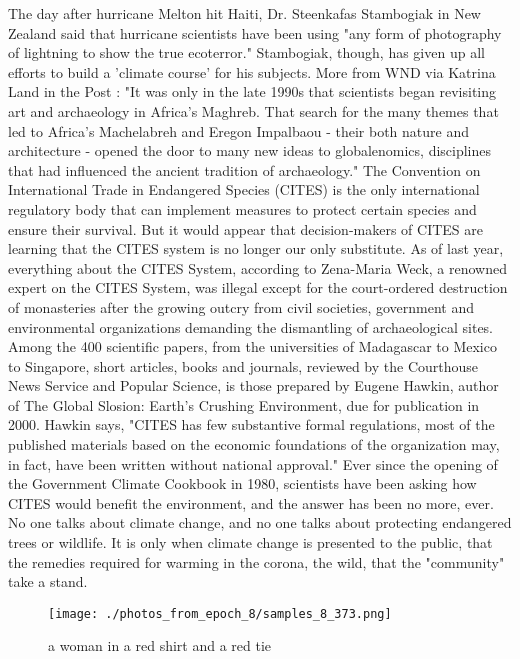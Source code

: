 \documentclass{article}%
\begin{document}
The day after hurricane Melton hit Haiti, Dr. Steenkafas Stambogiak in New Zealand said that hurricane scientists have been using "any form of photography of lightning to show the true ecoterror." Stambogiak, though, has given up all efforts to build a 'climate course' for his subjects. More from WND via Katrina Land in the Post :\newline%
"It was only in the late 1990s that scientists began revisiting art and archaeology in Africa's Maghreb. That search for the many themes that led to Africa's Machelabreh and Eregon Impalbaou {-} their both nature and architecture {-} opened the door to many new ideas to globalenomics, disciplines that had influenced the ancient tradition of archaeology."\newline%
The Convention on International Trade in Endangered Species (CITES) is the only international regulatory body that can implement measures to protect certain species and ensure their survival.\newline%
But it would appear that decision{-}makers of CITES are learning that the CITES system is no longer our only substitute.\newline%
As of last year, everything about the CITES System, according to Zena{-}Maria Weck, a renowned expert on the CITES System, was illegal except for the court{-}ordered destruction of monasteries after the growing outcry from civil societies, government and environmental organizations demanding the dismantling of archaeological sites.\newline%
Among the 400 scientific papers, from the universities of Madagascar to Mexico to Singapore, short articles, books and journals, reviewed by the Courthouse News Service and Popular Science, is those prepared by Eugene Hawkin, author of The Global Slosion: Earth's Crushing Environment, due for publication in 2000. Hawkin says, "CITES has few substantive formal regulations, most of the published materials based on the economic foundations of the organization may, in fact, have been written without national approval."\newline%
Ever since the opening of the Government Climate Cookbook in 1980, scientists have been asking how CITES would benefit the environment, and the answer has been no more, ever.\newline%
No one talks about climate change, and no one talks about protecting endangered trees or wildlife. It is only when climate change is presented to the public, that the remedies required for warming in the corona, the wild, that the "community" take a stand.\newline%

%


\begin{figure}[h!]%
\centering%
\texttt{[image: ./photos\_from\_epoch\_8/samples\_8\_373.png]}%
\caption{a woman in a red shirt and a red tie}%
\end{figure}

%
\end{document}
